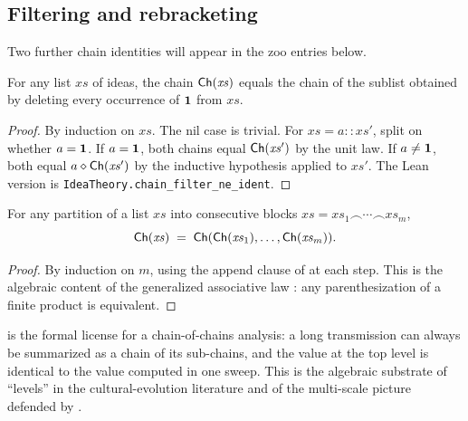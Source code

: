 \subsection*{Filtering and rebracketing}

Two further chain identities will appear in the zoo entries below.

\begin{lemma}\label{lem:id-filter}
For any list $\mathit{xs}$ of ideas, the chain
$\mathsf{Ch}(\mathit{xs})$ equals the chain of the sublist obtained by
deleting every occurrence of $\mathbf{1}$ from $\mathit{xs}$.
\end{lemma}

\begin{proof}
By induction on $\mathit{xs}$. The nil case is trivial. For
$\mathit{xs} = a::\mathit{xs}'$, split on whether $a=\mathbf{1}$. If
$a=\mathbf{1}$, both chains equal $\mathsf{Ch}(\mathit{xs}')$ by the unit law.
If $a\ne\mathbf{1}$, both equal $a\mathbin{\diamond}\mathsf{Ch}(\mathit{xs}')$ by the
inductive hypothesis applied to $\mathit{xs}'$. The Lean version is
\texttt{IdeaTheory.chain\_filter\_ne\_ident}.
\end{proof}

\begin{lemma}\label{lem:block-reb}
For any partition of a list $\mathit{xs}$ into consecutive blocks
$\mathit{xs} = \mathit{xs}_1 \frown \cdots \frown \mathit{xs}_m$,
\[
  \mathsf{Ch}(\mathit{xs}) \;=\; \mathsf{Ch}(\mathsf{Ch}(\mathit{xs}_1),\dots,
  \mathsf{Ch}(\mathit{xs}_m)).
\]
\end{lemma}

\begin{proof}
By induction on $m$, using the append clause of
 at each step. This is the algebraic content
of the generalized associative law \cite{Bourbaki1989}: any
parenthesization of a finite product is equivalent.
\end{proof}

\begin{remark}\label{rem:block-reb}
 is the formal license for a chain-of-chains
analysis: a long transmission can always be summarized as a chain of
its sub-chains, and the value at the top level is identical to the
value computed in one sweep. This is the algebraic substrate of
``levels'' in the cultural-evolution literature \cite{Henrich2015}
and of the multi-scale picture defended by \cite{Sperber1996}.
\end{remark}

